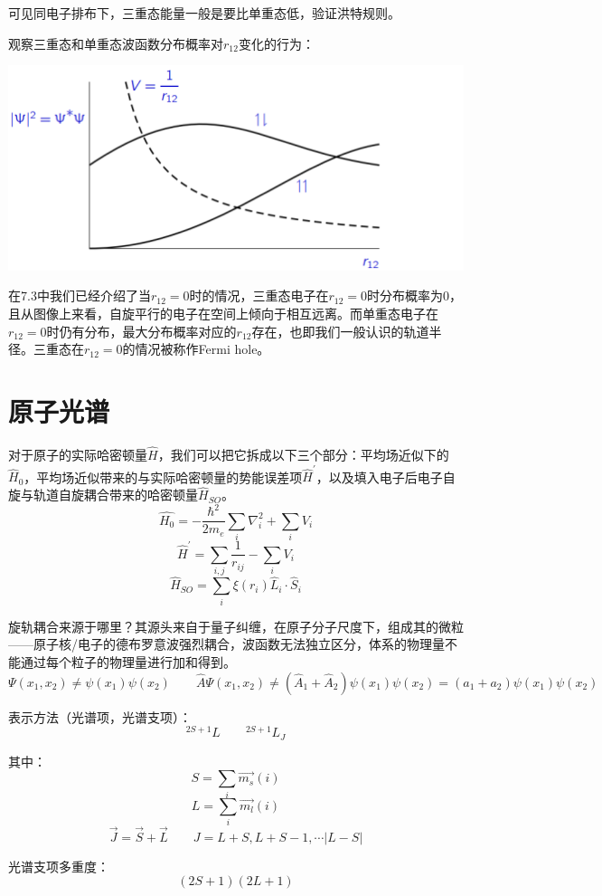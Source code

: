 可见同电子排布下，三重态能量一般是要比单重态低，验证洪特规则。

观察三重态和单重态波函数分布概率对$r_{12}$变化的行为：
\begin{center}
    \includegraphics[scale=0.8]{fig/lzhx/微信图片_20211030111438.png}
\end{center}

在7.3中我们已经介绍了当$r_{12}=0$时的情况，三重态电子在$r_{12}=0$时分布概率为0，且从图像上来看，自旋平行的电子在空间上倾向于相互远离。而单重态电子在$r_{12}=0$时仍有分布，最大分布概率对应的$r_{12}$存在，也即我们一般认识的轨道半径。三重态在$r_{12}=0$的情况被称作Fermi hole。

\section{原子光谱}
对于原子的实际哈密顿量$\hat{H}$，我们可以把它拆成以下三个部分：平均场近似下的$\hat{H}_0$，平均场近似带来的与实际哈密顿量的势能误差项$\hat{H}^{'}$，以及填入电子后电子自旋与轨道自旋耦合带来的哈密顿量$\hat{H}_{SO}$。
\[\hat{H_0}=-\frac{\hbar^2}{2m_e}\sum_i\nabla^2_i+\sum_iV_i\]
\[\hat{H}^{'}=\sum_{i,j}\frac{1}{r_{ij}}-\sum_iV_i\]
\[\hat{H}_{SO}=\sum_{i}\xi(r_i)\hat{L}_i \cdot \hat{S}_i\]

旋轨耦合来源于哪里？其源头来自于量子纠缠，在原子分子尺度下，组成其的微粒——原子核/电子的德布罗意波强烈耦合，波函数无法独立区分，体系的物理量不能通过每个粒子的物理量进行加和得到。
\[\Psi(x_1,x_2) \neq \psi(x_1)\psi(x_2) \qquad \hat{A}\Psi(x_1,x_2) \neq (\hat{A}_1+\hat{A}_2)\psi(x_1)\psi(x_2)=(a_1+a_2)\psi(x_1)\psi(x_2)\]

表示方法（光谱项，光谱支项）：
\[^{2S+1}L \qquad ^{2S+1}L_J\]

其中：
\[S=\sum_i\overrightarrow{m_s}(i)\]
\[L=\sum_i\overrightarrow{m_l}(i)\]
\[\overrightarrow{J}=\overrightarrow{S}+\overrightarrow{L} \qquad J=L+S,L+S-1,\cdots |L-S|\]

光谱支项多重度：
\[(2S+1)(2L+1)\]

